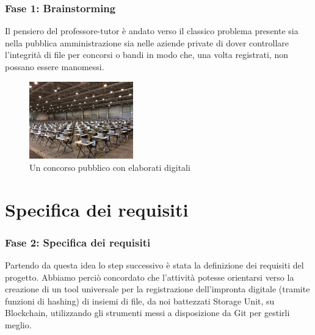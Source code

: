 \documentclass{beamer}
\begin{document}
\begin{frame}
	\frametitle{Fase 1: Brainstorming}
	Il pensiero del professore-tutor è andato verso il classico problema presente sia nella pubblica amministrazione sia nelle aziende private di dover controllare l’integrità di file per concorsi o bandi in modo che, una volta registrati, non possano essere manomessi.
	\medskip
	\begin{figure}
		\includegraphics[width=0.40\textwidth]{figures/concorso-fiera-di-roma.jpg}
		\caption{Un concorso pubblico con elaborati digitali}
	\end{figure}
\end{frame}
\section{Specifica dei requisiti}
\begin{frame}
	\frametitle{Fase 2: Specifica dei requisiti}
	Partendo da questa idea lo step successivo è stata la definizione dei requisiti del progetto. Abbiamo perciò concordato che l’attività potesse orientarsi verso la creazione di un tool universale per la registrazione dell’impronta digitale (tramite funzioni di hashing) di insiemi di file, da noi battezzati Storage Unit, su Blockchain, utilizzando gli strumenti messi a disposizione da Git per gestirli meglio.
\end{frame}
\end{document}
